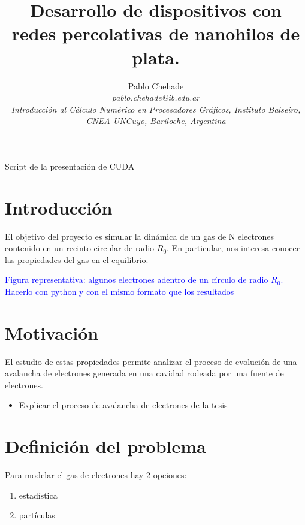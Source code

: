 \documentclass[aps,prb,twocolumn,superscriptaddress,floatfix,longbibliography]{revtex4-2}
\newif\ifptitle
\newif\ifpnumber
\newcounter{para}
\newcommand\ptitle[1]{\par\refstepcounter{para}
{\ifpnumber{\noindent\textcolor{lightgray}{\textbf{\thepara}}\indent}\fi}
{\ifptitle{\textbf{[{#1}]}}\fi}}
\begin{document}
\newcommand{\mytitle}{Desarrollo de dispositivos con redes percolativas de nanohilos de plata.}

\title{\mytitle}

\author{Pablo Chehade \\
    \small \textit{pablo.chehade@ib.edu.ar} \\
    \small \textit{Introducción al Cálculo Numérico en Procesadores Gráficos, Instituto Balseiro, CNEA-UNCuyo, Bariloche, Argentina} \\}


\maketitle

Script de la presentación de CUDA


\section{Introducción}
El objetivo del proyecto es simular la dinámica de un gas de N electrones contenido en un recinto circular de radio $R_0$. En particular, nos interesa conocer las propiedades del gas en el equilibrio.

\textcolor{blue}{Figura representativa: algunos electrones adentro de un círculo de radio $R_0$. Hacerlo con python y con el mismo formato que los resultados}

\section{Motivación}
El estudio de estas propiedades permite analizar el proceso de evolución de una avalancha de electrones generada en una cavidad rodeada por una fuente de electrones.


\begin{itemize}
    \item Explicar el proceso de avalancha de electrones de la tesis
\end{itemize}


\section{Definición del problema}

\ptitle{Opciones de modelo y qué modelo elegimos}
Para modelar el gas de electrones hay 2 opciones:
\begin{enumerate}
    \item estadística
    \item partículas
\end{enumerate}
\end{document}
